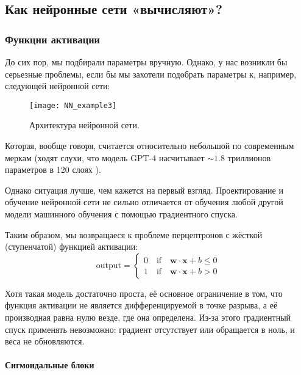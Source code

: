 \subsection{Как нейронные сети «вычисляют»?}

\subsubsection{Функции активации}

До сих пор, мы подбирали параметры вручную. Однако, у нас возникли бы серьезные 
проблемы, если бы мы захотели подобрать параметры к, например, следующей нейронной сети:
\newpage

\begin{figure}[h!]
    \centering
    \texttt{[image: NN\_example3]}
    \caption{Архитектура нейронной сети.}
    \label{fig:NN3}
\end{figure}

Которая, вообще говоря, считается относительно небольшой по современным меркам 
(ходят слухи, что модель GPT-4 насчитывает $\sim 1.8$ триллионов параметров в 
120 слоях \cite{gpt4_architecture}).

Однако ситуация лучше, чем кажется на первый взгляд. 
Проектирование и обучение нейронной сети не сильно отличается от обучения 
любой другой модели машинного обучения с помощью градиентного спуска. 

Таким образом, мы возвращаеся к проблеме перцептронов с жёсткой (ступенчатой) 
функцией активации:
\begin{equation*}
    \text{output} = \begin{cases}
        0 \quad \text{if} \quad \bm{w} \cdot \bm{x} + b \leq 0 \\
        1 \quad \text{if} \quad \bm{w} \cdot \bm{x} + b > 0 
    \end{cases}
\end{equation*}

Хотя такая модель достаточно проста, её основное ограничение в том, 
что функция активации не является дифференцируемой в точке разрыва, 
а её производная равна нулю везде, где она определена. 
Из-за этого градиентный спуск применять невозможно: градиент отсутствует или 
обращается в ноль, и веса не обновляются.

\paragraph{Сигмоидальные блоки}

